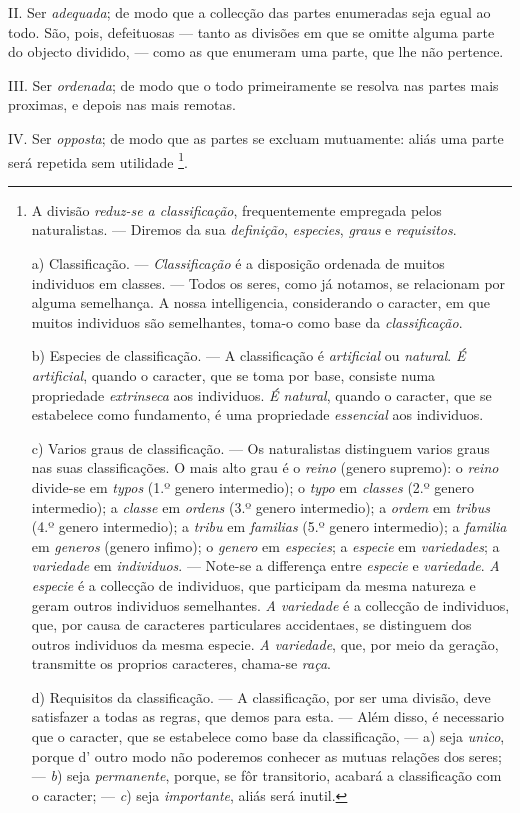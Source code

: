 II. Ser \emph{adequada}; de modo que a collecção das partes enumeradas seja egual ao todo. São, pois, defeituosas --- tanto as divisões em que se omitte alguma parte do objecto dividido, --- como as que enumeram uma parte, que lhe não pertence.

III. Ser \emph{ordenada}; de modo que o todo primeiramente se resolva nas partes mais proximas, e depois nas mais remotas.

IV. Ser \emph{opposta}; de modo que as partes se excluam mutuamente: aliás uma parte será repetida sem utilidade \footnote{A divisão \emph{reduz-se a classificação}, frequentemente empregada pelos naturalistas. --- Diremos da sua \emph{definição}, \emph{especies}, \emph{graus} e \emph{requisitos}.\par a) Classificação. --- \emph{Classificação} é a disposição ordenada de muitos individuos em classes. --- Todos os seres, como já notamos, se relacionam por alguma semelhança. A nossa intelligencia, considerando o caracter, em que muitos individuos são semelhantes, toma-o como base da \emph{classificação}.\par b) Especies de classificação. --- A classificação é \emph{artificial} ou \emph{natural}. \emph{É artificial}, quando o caracter, que se toma por base, consiste numa propriedade \emph{extrinseca} aos individuos. \emph{É natural}, quando o caracter, que se estabelece como fundamento, é uma propriedade \emph{essencial} aos individuos.\par c) Varios graus de classificação. --- Os naturalistas distinguem varios graus nas suas classificações. O mais alto grau é o \emph{reino} (genero supremo): o \emph{reino} divide-se em \emph{typos} (1.º genero intermedio); o \emph{typo} em \emph{classes} (2.º genero intermedio); a \emph{classe} em \emph{ordens} (3.º genero intermedio); a \emph{ordem} em \emph{tribus} (4.º genero intermedio); a \emph{tribu} em \emph{familias} (5.º genero intermedio); a \emph{familia} em \emph{generos} (genero infimo); o \emph{genero} em \emph{especies}; a \emph{especie} em \emph{variedades}; a \emph{variedade} em \emph{individuos}. --- Note-se a differença entre \emph{especie} e \emph{variedade}. \emph{A especie} é a collecção de individuos, que participam da mesma natureza e geram outros individuos semelhantes. \emph{A variedade} é a collecção de individuos, que, por causa de caracteres particulares accidentaes, se distinguem dos outros individuos da mesma especie. \emph{A variedade}, que, por meio da geração, transmitte os proprios caracteres, chama-se \emph{raça}.\par d) Requisitos da classificação. --- A classificação, por ser uma divisão, deve satisfazer a todas as regras, que demos para esta. --- Além disso, é necessario que o caracter, que se estabelece como base da classificação, --- a) seja \emph{unico}, porque d' outro modo não poderemos conhecer as mutuas relações dos seres; --- \emph{b}) seja \emph{permanente}, porque, se fôr transitorio, acabará a classificação com o caracter; --- \emph{c}) seja \emph{importante}, aliás será inutil.}.

